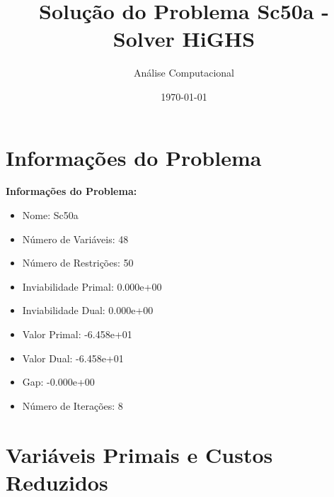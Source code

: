 \documentclass[12pt]{article}
\title{Solução do Problema Sc50a - Solver HiGHS}
\author{Análise Computacional}
\date{\today}
\begin{document}
\maketitle

\section{Informações do Problema}

\textbf{Informações do Problema:}
\begin{itemize}
\item Nome: Sc50a
\item Número de Variáveis: 48
\item Número de Restrições: 50
\item Inviabilidade Primal: 0.000e+00
\item Inviabilidade Dual: 0.000e+00
\item Valor Primal: -6.458e+01
\item Valor Dual: -6.458e+01
\item Gap: -0.000e+00
\item Número de Iterações: 8
\end{itemize}


\section{Variáveis Primais e Custos Reduzidos}
\end{document}
